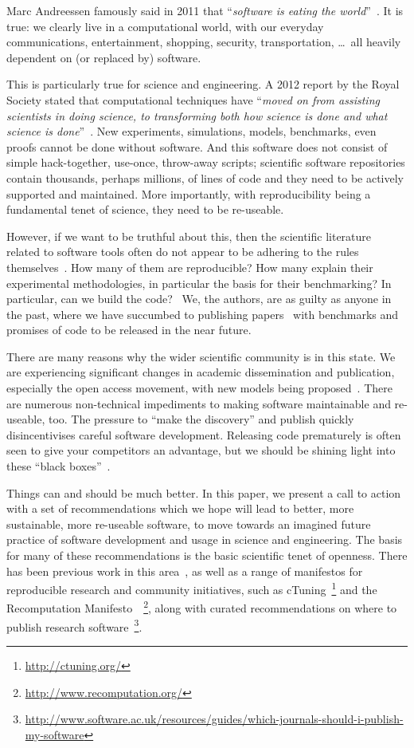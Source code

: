\documentclass[conference]{IEEEtran}
\begin{document}
Marc Andreessen famously said in 2011 that ``{\emph{software is eating the
world}}''~\cite{andreessen:2011}. It is true: we clearly live in a
computational world, with our everyday communications, entertainment,
shopping, security, transportation, \dots\ all heavily dependent on
(or replaced by) software.

This is particularly true for science and engineering. A 2012 report
by the Royal Society stated that computational techniques have
``{\emph{moved on from assisting scientists in doing science, to
transforming both how science is done and what science is
done}}''~\cite{rssaaoe:2012}. New experiments, simulations, models,
benchmarks, even proofs cannot be done without software. And this
software does not consist of simple hack-together, use-once,
throw-away scripts; scientific software repositories contain
thousands, perhaps millions, of lines of code and they need to be
actively supported and maintained. More importantly, with
reproducibility being a fundamental tenet of science, they need to be
re-useable.

However, if we want to be truthful about this, then the scientific
literature related to software tools often do not appear to be
adhering to the rules themselves~\cite{nature:2011}. How many of them are
reproducible? How many explain their experimental methodologies, in
particular the basis for their benchmarking? In particular, can we build the
code?~\cite{collberg-et-al:2014} We, the authors, are as guilty as
anyone in the past, where we have succumbed to publishing
papers~\cite{crick-et-al:2009,Berdine2011SLAyer} with benchmarks and
promises of code to be released in the near future.

There are many reasons why the wider scientific community is in this
state. We are experiencing significant changes in academic
dissemination and publication, especially the open access movement,
with new models being
proposed~\cite{stodden-et-al:2013,fursin+dubach:2014}.  There are
numerous non-technical impediments to making software maintainable and
re-useable, too. The pressure to ``make the discovery'' and publish
quickly disincentivises careful software development. Releasing
code prematurely is often seen to give your competitors an
advantage, but we should be shining light into these ``black
boxes''~\cite{morin-et-al:2012}.

Things can and should be much better. In this paper, we present a call
to action with a set of recommendations which we hope will lead to
better, more sustainable, more re-useable software, to move towards an
imagined future practice of software development and usage in science
and engineering.  The basis for many of these recommendations is the
basic scientific tenet of openness. There has been previous work in
this area~\cite{sim-et-al:2003,chirigati-et-al:2013}, as well as a
range of manifestos for reproducible research and community
initiatives, such as cTuning~\footnote{\url{http://ctuning.org/}} and
the Recomputation
Manifesto~\cite{gent:2013}~\footnote{\url{http://www.recomputation.org/}},
along with curated recommendations on where to publish research
software~\footnote{\url{http://www.software.ac.uk/resources/guides/which-journals-should-i-publish-my-software}}.
\end{document}
